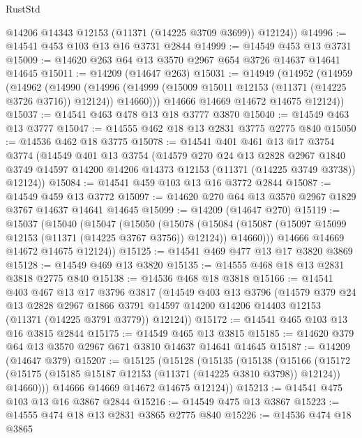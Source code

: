 \begin{lexlean}{RustStd}
\begin{coremodule}
{\begin{coremodule}
{{{{{{{{{{{{{{{{{{{{{{{{{{{{{{{{{        @14206
        @14343
        @12153
        (@11371 (@14225 @3709 @3699))
        @12124))
@14996 := @14541 @453 @103 @13 @16 @3731 @2844
@14999 := @14549 @453 @13 @3731
@15009 := @14620 @263 @64 @13 @3570 @2967 @654 @3726 @14637 @14641 @14645
@15011 := @14209 (@14647 @263)
@15031 := @14949
    (@14952
      (@14959
        (@14962
          (@14990
            (@14996 (@14999 (@15009 @15011 @12153 (@11371 (@14225 @3726 @3716)) @12124)) @14660)))
        @14666
        @14669
        @14672
        @14675
        @12124))
@15037 := @14541 @463 @478 @13 @18 @3777 @3870
@15040 := @14549 @463 @13 @3777
@15047 := @14555 @462 @18 @13 @2831 @3775 @2775 @840
@15050 := @14536 @462 @18 @3775
@15078 := @14541
    @401
    @461
    @13
    @17
    @3754
    @3774
    (@14549
      @401
      @13
      @3754
      (@14579
        @270
        @24
        @13
        @2828
        @2967
        @1840
        @3749
        @14597
        @14200
        @14206
        @14373
        @12153
        (@11371 (@14225 @3749 @3738))
        @12124))
@15084 := @14541 @459 @103 @13 @16 @3772 @2844
@15087 := @14549 @459 @13 @3772
@15097 := @14620 @270 @64 @13 @3570 @2967 @1829 @3767 @14637 @14641 @14645
@15099 := @14209 (@14647 @270)
@15119 := @15037
    (@15040
      (@15047
        (@15050
          (@15078
            (@15084 (@15087 (@15097 @15099 @12153 (@11371 (@14225 @3767 @3756)) @12124)) @14660)))
        @14666
        @14669
        @14672
        @14675
        @12124))
@15125 := @14541 @469 @477 @13 @17 @3820 @3869
@15128 := @14549 @469 @13 @3820
@15135 := @14555 @468 @18 @13 @2831 @3818 @2775 @840
@15138 := @14536 @468 @18 @3818
@15166 := @14541
    @403
    @467
    @13
    @17
    @3796
    @3817
    (@14549
      @403
      @13
      @3796
      (@14579
        @379
        @24
        @13
        @2828
        @2967
        @1866
        @3791
        @14597
        @14200
        @14206
        @14403
        @12153
        (@11371 (@14225 @3791 @3779))
        @12124))
@15172 := @14541 @465 @103 @13 @16 @3815 @2844
@15175 := @14549 @465 @13 @3815
@15185 := @14620 @379 @64 @13 @3570 @2967 @671 @3810 @14637 @14641 @14645
@15187 := @14209 (@14647 @379)
@15207 := @15125
    (@15128
      (@15135
        (@15138
          (@15166
            (@15172 (@15175 (@15185 @15187 @12153 (@11371 (@14225 @3810 @3798)) @12124)) @14660)))
        @14666
        @14669
        @14672
        @14675
        @12124))
@15213 := @14541 @475 @103 @13 @16 @3867 @2844
@15216 := @14549 @475 @13 @3867
@15223 := @14555 @474 @18 @13 @2831 @3865 @2775 @840
@15226 := @14536 @474 @18 @3865
}}}}}}}}}}}}}}}}}}}}}}}}}}}}}}}}}
\end{coremodule}}
\end{coremodule}
\end{lexlean}
